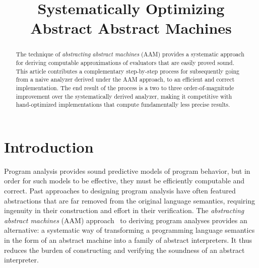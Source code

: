 \documentclass[preprint,onecolumn,9pt]{sigplanconf} %
\newcommand{\naive}{naive}
\begin{document}
\copyrightdata{[to be supplied]}


\title{Systematically Optimizing Abstract Abstract Machines}

           {}
           {}
\maketitle

\begin{abstract}
The technique of \emph{abstracting abstract machines} (AAM) provides a
systematic approach for deriving computable approximations of
evaluators that are easily proved sound.
%
This article contributes a complementary step-by-step process for
subsequently going from a \naive{} analyzer derived under the AAM
approach, to an efficient and correct implementation.  The end result
of the process is a two to three order-of-magnitude improvement over
the systematically derived analyzer, making it competitive with
hand-optimized implementations that compute fundamentally less precise
results.
\end{abstract}




\section{Introduction}

Program analysis provides sound predictive models of program behavior, but
in order for such models to be effective, they must be efficiently
computable and correct.  Past approaches to designing program analysis
have often featured abstractions that are far removed from the
original language semantics, requiring ingenuity in their construction
and effort in their verification.
%
The \emph{abstracting abstract machines} (AAM)
approach~\cite{dvanhorn:VanHorn2011Abstracting,dvanhorn:VanHorn2012Systematic}
to deriving program analyses provides an alternative: a systematic way
of transforming a programming language semantics in the form of an
abstract machine into a family of abstract interpreters.  It thus reduces
the burden of constructing and verifying the soundness of an abstract
interpreter.
%
\end{document}
